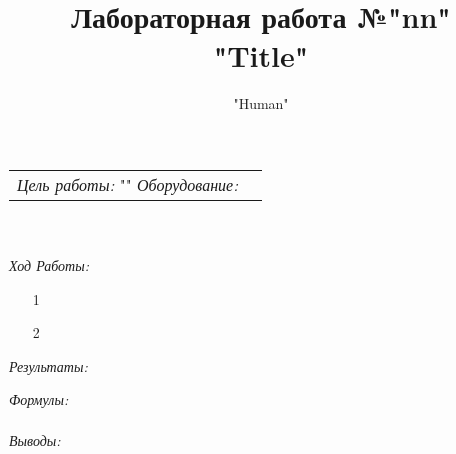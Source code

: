 \documentclass[12pt,a4paper]{article}
\title{Лабораторная работа №"nn"\\"Title"}
\author{"Human"}
\begin{document}
\maketitle

\begin{tabular}{p{12cm} l}
\textit{Цель работы:\newline} "" \newline \newline
\textit{Оборудование:\newline}  
\end{tabular}\\ \\

\textit{Ход Работы:}
\begin{itemize}
\item[1] 
\item[2] 
\end{itemize}

\textit{Результаты:\\}

\textit{Формулы:}
\begin{align*}

\end{align*}

\textit{Выводы:\\}
\end{document}
